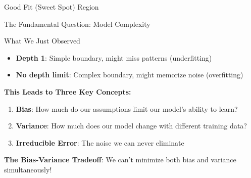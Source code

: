 \documentclass{beamer}
\begin{document}
\begin{frame}{Good Fit (Sweet Spot) Region}
\centering
{}
\end{frame}


	\begin{frame}{The Fundamental Question: Model Complexity}
\begin{alertbox}{What We Just Observed}
	\scriptsize
\begin{itemize}
\item \textbf{Depth 1}: Simple boundary, might miss patterns (underfitting)
\item \textbf{No depth limit}: Complex boundary, might memorize noise (overfitting)
\end{itemize}
\end{alertbox}

\begin{keypointsbox}
\textbf{This Leads to Three Key Concepts:}
\scriptsize
\begin{enumerate}
\item \textbf{Bias}: How much do our assumptions limit our model's ability to learn?
\item \textbf{Variance}: How much does our model change with different training data?
\item \textbf{Irreducible Error}: The noise we can never eliminate
\end{enumerate}
\end{keypointsbox}

\textbf{The Bias-Variance Tradeoff}: We can't minimize both bias and variance simultaneously!
\end{frame}
\end{document}

